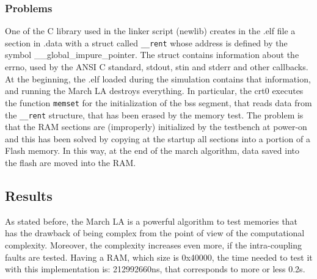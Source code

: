 \documentclass[paper=a4, fontsize=10pt]{scrartcl}	%
\begin{document}
	\subsubsection{Problems}
	One of the C library used in the linker script (newlib) creates in the .elf file a section in .data with a struct called \texttt{\_\_rent} whose address is defined by the symbol \_\_global\_impure\_pointer. The struct contains information about the errno, used by the ANSI C standard, stdout, stin and stderr and other callbacks.
	At the beginning, the .elf loaded during the simulation contains that information, and running the March LA destroys everything. In particular, the crt0 executes the function \texttt{memset} for the initialization of the bss segment, that reads data from the \texttt{\_\_rent} structure, that has been erased by the memory test.
	The problem is that the RAM sections are (improperly) initialized by the testbench at power-on and this has been solved by copying at the startup all sections into a portion of a Flash memory. In this way, at the end of the march algorithm, data saved into the flash are moved into the RAM.
	
	\subsection{Results}
	As stated before, the March LA is a powerful algorithm to test memories that has the drawback of being complex from the point of view of the computational complexity. Moreover, the complexity increases even more, if the intra-coupling faults are tested. Having a RAM, which size is 0x40000, the time needed to test it with this implementation is: 212992660ns, that corresponds to more or less 0.2s.
	
\end{document}
